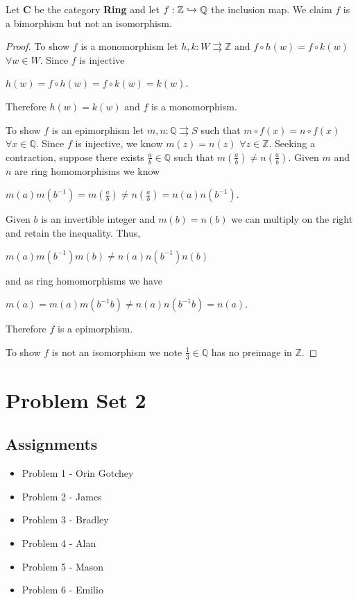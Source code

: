 \documentclass{article}
\newcommand{\Q}{\mathbb{Q}}
\newcommand{\Z}{\mathbb{Z}}
\begin{document}
	\vspace{2mm}
	
	\noindent Let \textbf{C} be the category \textbf{Ring} and let $f:\Z \xhookrightarrow[]{} \Q$ the inclusion map.
	We claim $f$ is a bimorphism but not an isomorphism.
	
	\begin{proof}
		To show $f$ is a monomorphism let $h,k:W \rightrightarrows \Z$ and $f\circ h(w)=f \circ k (w)$ $\forall w\in W$.
		Since $f$ is injective
		\begin{center}
			$h(w)=f\circ h(w)=f\circ k(w)=k(w)$.
		\end{center}
		Therefore $h(w)=k(w)$ and $f$ is a monomorphism.
		
		To show $f$ is an epimorphism let $m,n:\Q \rightrightarrows S$ such that $m\circ f(x)=n\circ f(x)$ $\forall x\in \Q$.
		Since $f$ is injective, we know $m(z)=n(z)$ $\forall z\in\Z$.
		Seeking a contraction, suppose there exists $\frac{a}{b}\in \Q$ such that $m(\frac{a}{b})\neq n(\frac{a}{b})$.
		Given $m$ and $n$ are ring homomorphisms we know
		\begin{center}
			$m(a)m(b^{-1})=m(\frac{a}{b}) \neq n(\frac{a}{b})=n(a)n(b^{-1})$.
		\end{center}
		Given $b$ is an invertible integer and $m(b)=n(b)$ we can multiply on the right and retain the inequality.
		Thus, 
		\begin{center}
			$m(a)m(b^{-1})m(b)\neq n(a)n(b^{-1})n(b)$
		\end{center} 
		and as ring homomorphisms we have
		\begin{center}
			$m(a)=m(a)m(b^{-1}b)\neq n(a)n(b^{-1}b)=n(a)$.
		\end{center}
		Therefore $f$ is a epimorphism.
		
		To show $f$ is not an isomorphism we note $\frac{1}{3}\in \Q$ has no preimage in $\Z$.
	\end{proof}
\section{Problem Set 2}
\subsection*{Assignments}
\begin{itemize}
	\item Problem 1 - Orin Gotchey
	\item Problem 2 - James
	\item Problem 3 - Bradley
	\item Problem 4 - Alan
	\item Problem 5 - Mason
	\item Problem 6 - Emilio
\end{itemize}
\end{document}
